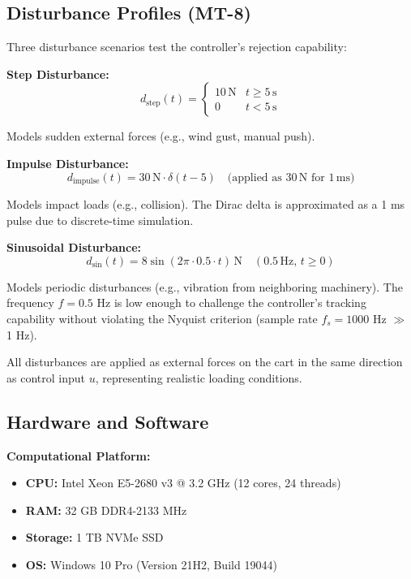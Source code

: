 \subsection{Disturbance Profiles (MT-8)}
\label{subsec:disturbance_profiles}

Three disturbance scenarios test the controller's rejection capability:

\textbf{Step Disturbance:}
\begin{equation}
\label{eq:disturbance_step}
d_{\text{step}}(t) = \begin{cases}
10 \, \text{N} & t \geq 5 \, \text{s} \\
0 & t < 5 \, \text{s}
\end{cases}
\end{equation}

Models sudden external forces (e.g., wind gust, manual push).

\textbf{Impulse Disturbance:}
\begin{equation}
\label{eq:disturbance_impulse}
d_{\text{impulse}}(t) = 30 \, \text{N} \cdot \delta(t - 5) \quad \text{(applied as } 30 \, \text{N for } 1 \, \text{ms})
\end{equation}

Models impact loads (e.g., collision). The Dirac delta is approximated as a 1 ms pulse due to discrete-time simulation.

\textbf{Sinusoidal Disturbance:}
\begin{equation}
\label{eq:disturbance_sinusoidal}
d_{\text{sin}}(t) = 8 \sin(2\pi \cdot 0.5 \cdot t) \, \text{N} \quad (0.5 \, \text{Hz}, \, t \geq 0)
\end{equation}

Models periodic disturbances (e.g., vibration from neighboring machinery). The frequency $f = 0.5$ Hz is low enough to challenge the controller's tracking capability without violating the Nyquist criterion (sample rate $f_s = 1000$ Hz $\gg$ 1 Hz).

All disturbances are applied as external forces on the cart in the same direction as control input $u$, representing realistic loading conditions.

\subsection{Hardware and Software}
\label{subsec:hardware_software}

\textbf{Computational Platform:}
\begin{itemize}
    \item \textbf{CPU:} Intel Xeon E5-2680 v3 @ 3.2 GHz (12 cores, 24 threads)
    \item \textbf{RAM:} 32 GB DDR4-2133 MHz
    \item \textbf{Storage:} 1 TB NVMe SSD
    \item \textbf{OS:} Windows 10 Pro (Version 21H2, Build 19044)
\end{itemize}

